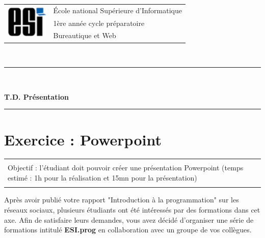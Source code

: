 \documentclass[11pt, a4paper]{article}
\begin{document}

\noindent
\begin{tabular}{ll}
\multirow{3}{*}{\includegraphics[width=2cm]{../esi-logo.png}} & \'Ecole national Supérieure d'Informatique\\
& 1ère année cycle préparatoire\\
& Bureautique et Web
\end{tabular}\\[.25cm]
\noindent\rule{\textwidth}{1pt}\\%
\begin{center}
{\LARGE \textbf{T.D. Présentation}}
\end{center}
\noindent\rule{\textwidth}{1pt}

\section*{Exercice : Powerpoint}

\vspace{-12pt}
\begin{tabular}{|p{\textwidth}|}
	\hline\\
	Objectif : l'étudiant doit pouvoir créer une présentation Powerpoint (temps estimé : 1h pour la réalisation et 15mn pour la présentation)   \\\\
	\hline
\end{tabular}

Après avoir publié votre rapport "Introduction à la programmation" sur les réseaux sociaux, plusieurs étudiants ont été intéressés par des formations dans cet axe. 
Afin de satisfaire leurs demandes, vous avez décidé d'organiser une série de formations intitulé \textbf{ESI.prog} en collaboration avec un groupe de vos collègues.
\end{document}
